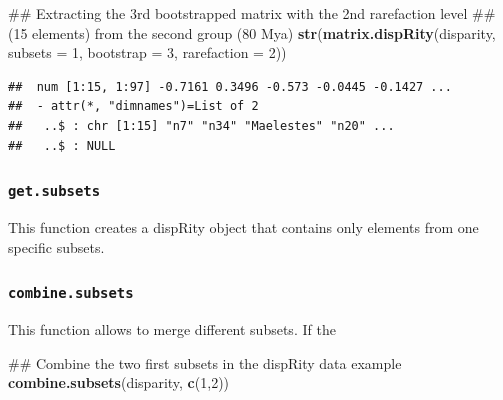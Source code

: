 \documentclass[]{book}
\newenvironment{Shaded}{\begin{snugshade}}{\end{snugshade}}
\newcommand{\KeywordTok}[1]{\textcolor[rgb]{0.13,0.29,0.53}{\textbf{#1}}}
\newcommand{\DataTypeTok}[1]{\textcolor[rgb]{0.13,0.29,0.53}{#1}}
\newcommand{\DecValTok}[1]{\textcolor[rgb]{0.00,0.00,0.81}{#1}}
\newcommand{\StringTok}[1]{\textcolor[rgb]{0.31,0.60,0.02}{#1}}
\newcommand{\OperatorTok}[1]{\textcolor[rgb]{0.81,0.36,0.00}{\textbf{#1}}}
\newcommand{\NormalTok}[1]{#1}
\theoremstyle{definition}
\theoremstyle{definition}
\theoremstyle{definition}
\theoremstyle{remark}
\begin{document}
\begin{Shaded}
\begin{Highlighting}[]
\NormalTok{## Extracting the 3rd bootstrapped matrix with the 2nd rarefaction level}
\NormalTok{## (15 elements) from the second group (80 Mya)}
\KeywordTok{str}\NormalTok{(}\KeywordTok{matrix.dispRity}\NormalTok{(disparity, }\DataTypeTok{subsets =} \DecValTok{1}\NormalTok{, }\DataTypeTok{bootstrap =} \DecValTok{3}\NormalTok{, }\DataTypeTok{rarefaction =} \DecValTok{2}\NormalTok{))}
\end{Highlighting}
\end{Shaded}

\begin{verbatim}
##  num [1:15, 1:97] -0.7161 0.3496 -0.573 -0.0445 -0.1427 ...
##  - attr(*, "dimnames")=List of 2
##   ..$ : chr [1:15] "n7" "n34" "Maelestes" "n20" ...
##   ..$ : NULL
\end{verbatim}

\subsubsection{\texorpdfstring{\texttt{get.subsets}}{get.subsets}}\label{get.subsets}

This function creates a dispRity object that contains only elements from
one specific subsets.

\begin{Shaded}
\end{Shaded}

\subsubsection{\texorpdfstring{\texttt{combine.subsets}}{combine.subsets}}\label{combine.subsets}

This function allows to merge different subsets. If the

\begin{Shaded}
\begin{Highlighting}[]
\NormalTok{## Combine the two first subsets in the dispRity data example}
\KeywordTok{combine.subsets}\NormalTok{(disparity, }\KeywordTok{c}\NormalTok{(}\DecValTok{1}\NormalTok{,}\DecValTok{2}\NormalTok{))}
\end{Highlighting}
\end{Shaded}
\end{document}
